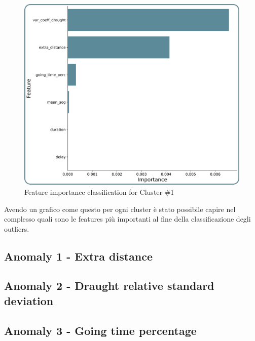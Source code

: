 \begin{figure}[H]
    \centering
    \includegraphics[width=13cm]{Images/3/importance.png}
    \caption{Feature importance classification for Cluster \#1}
\end{figure}

Avendo un grafico come questo per ogni cluster è stato possibile capire nel complesso quali sono le features più importanti al fine della classificazione degli outliers.

\subsection{Anomaly 1 - Extra distance}
\label{sec:anomaly-1}

\subsection{Anomaly 2 - Draught relative standard deviation}
\label{sec:anomaly-2}

\subsection{Anomaly 3 - Going time percentage}
\label{sec:anomaly-3}
